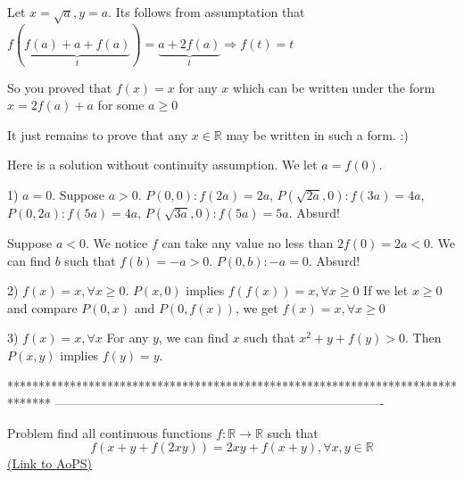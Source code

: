 \begin{solution}
	\begin{tcolorbox}Let $x=\sqrt{a},y=a$. Its follows from assumptation that $f(\underbrace{f(a)+a+f(a)}_{t})=\underbrace{a+2f(a)}_{t}\Rightarrow f(t)=t$\end{tcolorbox}
So you proved that $f(x)=x$ for any $x$ which can be written under the form $x=2f(a)+a$ for some $a\ge 0$

It just remains to prove that any $x\in\mathbb R$ may be written in such a form. :)
\end{solution}



\begin{solution}
	Here is a solution without continuity assumption.
We let $a=f(0)$.

1) $a=0$.
Suppose $a>0$. 
$P(0,0):f(2a)=2a$, 
$P(\sqrt{2a},0):f(3a)=4a$, 
$P(0,2a):f(5a)=4a$, 
$P(\sqrt{3a},0):f(5a)=5a$. Absurd!

Suppose $a<0$. We notice $f$ can take any value no less than $2f(0)=2a<0$. We can find $b$ such that $f(b)=-a>0$. $P(0,b):-a=0$. Absurd!

2) $f(x)=x,\forall x\geq0$.
$P(x,0)$ implies $f(f(x))=x,\forall x\geq0$
If we let $x\geq0$ and compare $P(0,x)$ and $P(0,f(x))$, we get $f(x)=x,\forall x\geq0$

3) $f(x)=x,\forall x$
For any $y$, we can find $x$ such that $x^2+y+f(y)>0$. Then $P(x,y)$ implies $f(y)=y$.
\end{solution}
*******************************************************************************
-------------------------------------------------------------------------------

\begin{problem}
	Problem find all continuous functions $f:\mathbb{R}\to\mathbb{R}$ such that
    \[f(x+y+f(2xy))=2xy+f(x+y),\forall x,y\in\mathbb{R}\]
	\flushright \href{https://artofproblemsolving.com/community/c6h529497}{(Link to AoPS)}
\end{problem}



